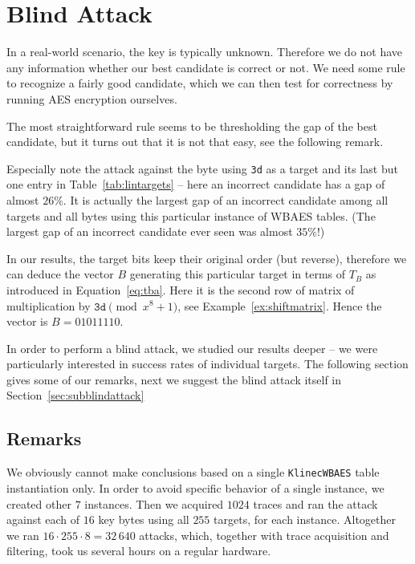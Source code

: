 \section{Blind Attack}
\label{sec:blindattack}

In a real-world scenario, the key is typically unknown. Therefore we do not have any information whether our best candidate is correct or not. We need some rule to recognize a fairly good candidate, which we can then test for correctness by running AES encryption ourselves.

The most straightforward rule seems to be thresholding the gap of the best candidate, but it turns out that it is not that easy, see the following remark.

\begin{remark}
\label{rem:false}
	Especially note the attack against the  byte using {\tt 3d} as a target and its last but one entry in Table~\ref{tab:lintargets} -- here an incorrect candidate has a gap of almost $26\%$. It is actually the largest gap of an incorrect candidate among all targets and all bytes using this particular instance of WBAES tables. (The largest gap of an incorrect candidate ever seen was almost $35\%$!)
	
	In our results, the target bits keep their original order (but reverse), therefore we can deduce the vector $B$ generating this particular target in terms of $T_B$ as introduced in Equation~\ref{eq:tba}. Here it is the second row of matrix of multiplication by $\texttt{3d}\pmod{x^8+1}$, see Example~\ref{ex:shiftmatrix}. Hence the vector is $B = 01011110$.
\end{remark}

In order to perform a blind attack, we studied our results deeper -- we were particularly interested in success rates of individual targets. The following section gives some of our remarks, next we suggest the blind attack itself in Section~\ref{sec:subblindattack}



\subsection{Remarks}
\label{sec:remarks}

We obviously cannot make conclusions based on a single {\tt KlinecWBAES} table instantiation only. In order to avoid specific behavior of a single instance, we created other $7$ instances. Then we acquired $1024$ traces and ran the attack against each of $16$ key bytes using all $255$ targets, for each instance. Altogether we ran $16\cdot255\cdot8=32\,640$ attacks, which, together with trace acquisition and filtering, took us several hours on a regular hardware.

